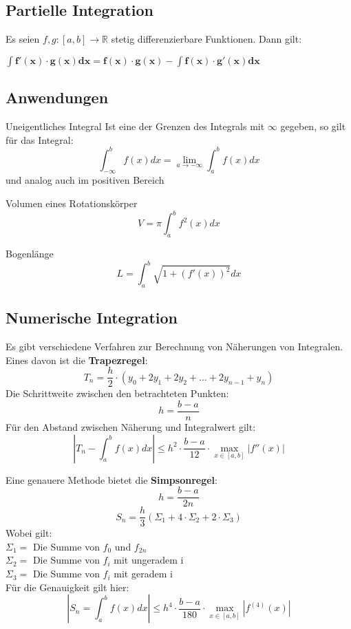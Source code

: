 \documentclass[german]{latex4ei/latex4ei_sheet}
\begin{document}
\begin{sectionbox}
\subsection{Partielle Integration}

	Es seien $f,g:[a,b]\rightarrow \mathbb{R}$ stetig differenzierbare Funktionen.
	Dann gilt:
	
	$\mathbf{\int f'(x) \cdot g(x) dx = f(x)\cdot g(x) - \int f(x) \cdot g'(x) dx}$
	


\subsection{Anwendungen}
\begin{cookbox} {Uneigentliches Integral}
Ist eine der Grenzen des Integrals mit $\infty$ gegeben, so gilt für das Integral: \\
$$\int_{-\infty}^{b} f(x)dx = \lim_{a\to-\infty}\int_{a}^{b}f(x)dx $$ 
und analog auch im positiven Bereich
    
\end{cookbox}

\end{sectionbox}
\begin{sectionbox}

\begin{cookbox}{Volumen eines Rotationskörper}
$$V = \pi\int_{a}^{b}f^2(x)dx$$
\end{cookbox}

\begin{cookbox}{Bogenlänge}
$$L = \int_{a}^{b}\sqrt{1+(f'(x))^2 } dx$$
\end{cookbox}

\subsection{Numerische Integration}
Es gibt verschiedene Verfahren zur Berechnung von Näherungen von Integralen. Eines davon ist die \textbf{Trapezregel}: 
$$T_n = \frac{h}{2}\cdot (y_0+2y_1+2y_2+ \dots + 2y_{n-1}+y_n)$$ 
Die Schrittweite zwischen den betrachteten Punkten: $$ h = \frac{b-a}{n}$$ 
Für den Abstand zwischen Näherung und Integralwert gilt: 
$$ | T_n - \int_{a}^{b}f(x) dx | \leq h^2 \cdot \frac{b-a}{12} \cdot \max_{x \in [a,b]}| f''(x) |
$$

Eine genauere Methode bietet die \textbf{Simpsonregel}: 
$$ h = \frac{b-a}{2n}$$ 
$$S_n = \frac{h}{3}(\Sigma_1 + 4 \cdot\Sigma_2 + 2 \cdot\Sigma_3 )$$
Wobei gilt: \\
$\Sigma_1 = $ Die Summe von $f_0$ und $f_{2n}$\\
$\Sigma_2 = $ Die Summe von $f_i$ mit ungeradem i\\
$\Sigma_3 = $ Die Summe von $f_i$ mit geradem i\\

Für die Genauigkeit gilt hier: 
$$ | S_n = \int_a^b f(x) dx | \leq h^4 \cdot \frac{b-a}{180} \cdot \max_{x \in [a,b] } | f^{(4)}(x)| $$ 


\end{sectionbox}
\end{document}

